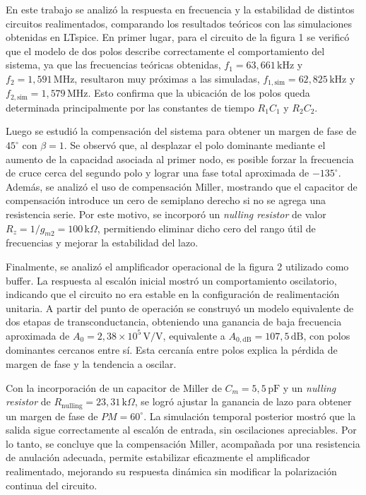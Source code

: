 En este trabajo se analizó la respuesta en frecuencia y la estabilidad de distintos circuitos realimentados, comparando los resultados teóricos con las simulaciones obtenidas en LTspice. En primer lugar, para el circuito de la figura 1 se verificó que el modelo de dos polos describe correctamente el comportamiento del sistema, ya que las frecuencias teóricas obtenidas, $f_1 = 63{,}661\,\mathrm{kHz}$ y $f_2 = 1{,}591\,\mathrm{MHz}$, resultaron muy próximas a las simuladas, $f_{1,\mathrm{sim}} = 62{,}825\,\mathrm{kHz}$ y $f_{2,\mathrm{sim}} = 1{,}579\,\mathrm{MHz}$. Esto confirma que la ubicación de los polos queda determinada principalmente por las constantes de tiempo $R_1C_1$ y $R_2C_2$.

Luego se estudió la compensación del sistema para obtener un margen de fase de $45^\circ$ con $\beta = 1$. Se observó que, al desplazar el polo dominante mediante el aumento de la capacidad asociada al primer nodo, es posible forzar la frecuencia de cruce cerca del segundo polo y lograr una fase total aproximada de $-135^\circ$. Además, se analizó el uso de compensación Miller, mostrando que el capacitor de compensación introduce un cero de semiplano derecho si no se agrega una resistencia serie. Por este motivo, se incorporó un \textit{nulling resistor} de valor $R_z = 1/g_{m2} = 100\,\mathrm{k}\Omega$, permitiendo eliminar dicho cero del rango útil de frecuencias y mejorar la estabilidad del lazo.

Finalmente, se analizó el amplificador operacional de la figura 2 utilizado como buffer. La respuesta al escalón inicial mostró un comportamiento oscilatorio, indicando que el circuito no era estable en la configuración de realimentación unitaria. A partir del punto de operación se construyó un modelo equivalente de dos etapas de transconductancia, obteniendo una ganancia de baja frecuencia aproximada de $A_0 = 2{,}38 \times 10^5\,\mathrm{V/V}$, equivalente a $A_{0,\mathrm{dB}} = 107{,}5\,\mathrm{dB}$, con polos dominantes cercanos entre sí. Esta cercanía entre polos explica la pérdida de margen de fase y la tendencia a oscilar.

Con la incorporación de un capacitor de Miller de $C_m = 5{,}5\,\mathrm{pF}$ y un \textit{nulling resistor} de $R_{\mathrm{nulling}} = 23{,}31\,\mathrm{k}\Omega$, se logró ajustar la ganancia de lazo para obtener un margen de fase de $PM = 60^\circ$. La simulación temporal posterior mostró que la salida sigue correctamente al escalón de entrada, sin oscilaciones apreciables. Por lo tanto, se concluye que la compensación Miller, acompañada por una resistencia de anulación adecuada, permite estabilizar eficazmente el amplificador realimentado, mejorando su respuesta dinámica sin modificar la polarización continua del circuito.